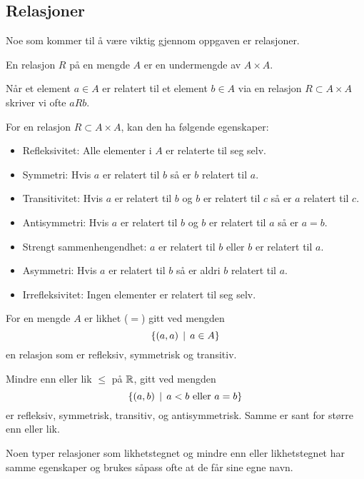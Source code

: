 \subsection{Relasjoner}
Noe som kommer til å være viktig gjennom oppgaven er
relasjoner.
\begin{definisjon}\label{Def:label}
    En relasjon $R$ på en mengde $A$ er en undermengde av
    $A\times A$.
\end{definisjon}
Når et element $a\in A$ er relatert til et element $b\in
A$ via en relasjon $R\subset A\times A$ skriver vi ofte
$aRb$.

For en relasjon $R\subset A\times A$, kan den ha følgende
egenskaper:
\begin{itemize}
    \item Refleksivitet: Alle elementer i $A$ er relaterte
      til seg selv.
    \item Symmetri: Hvis $a$ er relatert til $b$ så er $b$
      relatert til $a$.
    \item Transitivitet: Hvis $a$ er relatert til $b$ og
      $b$ er relatert til $c$ så er $a$ relatert til $c$.
    \item Antisymmetri: Hvis $a$ er relatert til $b$ og
      $b$ er relatert til $a$ så er $a=b$.
    \item Strengt sammenhengendhet: $a$ er relatert til
      $b$ eller $b$ er relatert til $a$.
    \item Asymmetri: Hvis $a$ er relatert til $b$ så er
      aldri $b$ relatert til $a$.
    \item Irrefleksivitet: Ingen elementer er relatert til
      seg selv.
\end{itemize}

\begin{eksempel}\label{Ex:LikRel}
  For en mengde $A$ er likhet ($=$) gitt ved mengden
  \[\left\{(a,a)\,\mid\,a\in A\right\}\]
  en relasjon som er refleksiv, symmetrisk og transitiv.
\end{eksempel}

\begin{eksempel}\label{Ex:MinLikRel}
  Mindre enn eller lik $\leq$ på $\mathbb{R}$, gitt ved mengden
  \[\left\{(a,b)\,\mid\,\text{$a<b$ eller $a=b$}\right\}\]
  er refleksiv, symmetrisk, transitiv, og antisymmetrisk.
  Samme er sant for større enn eller lik.
\end{eksempel}

Noen typer relasjoner som likhetstegnet og mindre enn
eller likhetstegnet har samme egenskaper og brukes såpass
ofte at de får sine egne navn.

